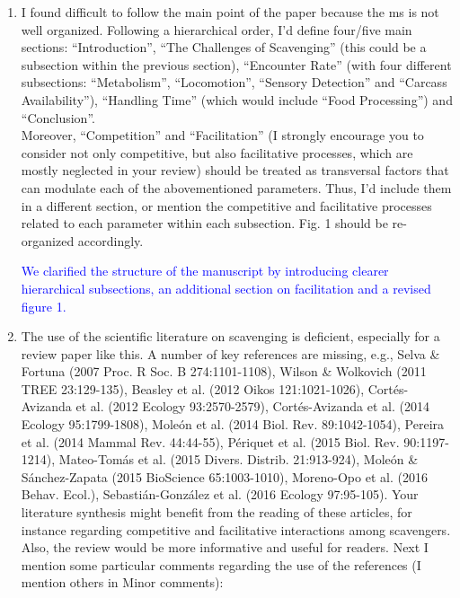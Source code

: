 \documentclass[12pt,letterpaper]{article}
\begin{document}
{\begin{enumerate}


\item{I found difficult to follow the main point of the paper because the ms is not well organized. Following a hierarchical order, I'd define four/five main sections: ``Introduction'', ``The Challenges of Scavenging'' (this could be a subsection within the previous section), ``Encounter Rate'' (with four different subsections: ``Metabolism'', ``Locomotion'', ``Sensory Detection'' and ``Carcass Availability''), ``Handling Time'' (which would include ``Food Processing'') and ``Conclusion''. \\ 

Moreover, ``Competition'' and ``Facilitation'' (I strongly encourage you to consider not only competitive, but also facilitative processes, which are mostly neglected in your review) should be treated as transversal factors that can modulate each of the abovementioned parameters. Thus, I'd include them in a different section, or mention the competitive and facilitative processes related to each parameter within each subsection. Fig. 1 should be re-organized accordingly.}

\textcolor{blue}{We clarified the structure of the manuscript by introducing clearer hierarchical subsections, an additional section on facilitation and a revised figure 1.}


\item{The use of the scientific literature on scavenging is deficient, especially for a review paper like this. A number of key references are missing, e.g., Selva \& Fortuna (2007 Proc. R Soc. B 274:1101-1108), Wilson \& Wolkovich (2011 TREE 23:129-135), Beasley et al. (2012 Oikos 121:1021-1026), Cort\'{e}s-Avizanda et al. (2012 Ecology 93:2570-2579), Cort\'{e}s-Avizanda et al. (2014 Ecology 95:1799-1808), Mole\'{o}n et al. (2014 Biol. Rev. 89:1042-1054), Pereira et al. (2014 Mammal Rev. 44:44-55), P\'{e}riquet et al. (2015 Biol. Rev. 90:1197-1214), Mateo-Tom\'{a}s et al. (2015 Divers. Distrib. 21:913-924), Mole\'{o}n \& S\'{a}nchez-Zapata (2015 BioScience 65:1003-1010), Moreno-Opo et al. (2016 Behav. Ecol.), Sebasti\'{a}n-Gonz\'{a}lez et al. (2016 Ecology 97:95-105). Your literature synthesis might benefit from the reading of these articles, for instance regarding competitive and facilitative interactions among scavengers. Also, the review would be more informative and useful for readers. Next I mention some particular comments regarding the use of the references (I mention others in Minor comments):}\\


\end{enumerate}}
\end{document}
